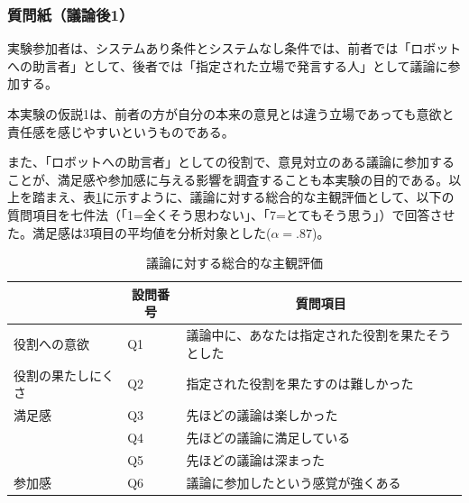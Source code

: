 \documentclass[11pt, a4paper]{jreport} %
\begin{document}




\subsubsection*{質問紙（議論後1）}
実験参加者は、システムあり条件とシステムなし条件では、前者では「ロボットへの助言者」として、後者では「指定された立場で発言する人」として議論に参加する。

本実験の仮説1は、前者の方が自分の本来の意見とは違う立場であっても意欲と責任感を感じやすいというものである。

また、「ロボットへの助言者」としての役割で、意見対立のある議論に参加することが、満足感や参加感に与える影響を調査することも本実験の目的である。以上を踏まえ、表\ref{tab:indev}に示すように、議論に対する総合的な主観評価として、以下の質問項目を七件法（「1=全くそう思わない」、「7=とてもそう思う」）で回答させた。満足感は3項目の平均値を分析対象とした($\alpha=.87$)。


\begin{table}[H]
\caption{議論に対する総合的な主観評価}
\centering
\label{tab:indev}
\begin{tabular}{@{}lll@{}}
\toprule
\multicolumn{1}{c}{} & \multicolumn{1}{c}{設問番号}&\multicolumn{1}{c}{質問項目}　\\ \midrule
役割への意欲             &Q1   & 議論中に、あなたは指定された役割を果たそうとした \\
役割の果たしにくさ                   &Q2  & 指定された役割を果たすのは難しかった       \\
満足感            &Q3      & 先ほどの議論は楽しかった             \\
                  &Q4   & 先ほどの議論に満足している            \\
                  &Q5   & 先ほどの議論は深まった              \\
参加感              &Q6    & 議論に参加したという感覚が強くある        \\
\bottomrule
\end{tabular}
\end{table}
\end{document}
